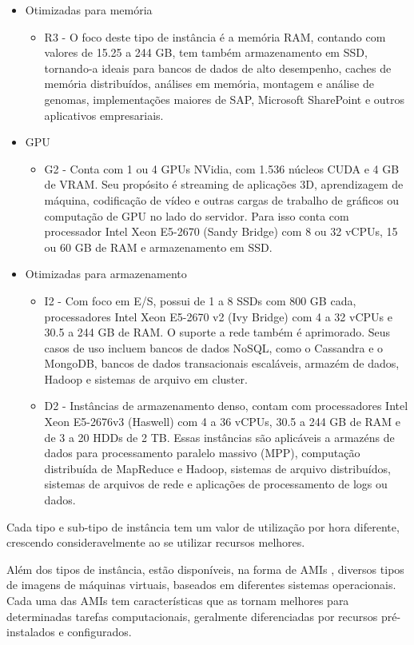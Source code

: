 \documentclass[tg]{mdtufsm}
\begin{document}
\begin{itemize}
\begin{itemize}
	\end{itemize}
\item Otimizadas para memória
	\begin{itemize}
	\item R3 - O foco deste tipo de instância é a memória RAM, contando com valores de 15.25 a 244 GB, tem também armazenamento em SSD, tornando-a ideais para bancos de dados de alto desempenho, caches de memória distribuídos, análises em memória, montagem e análise de genomas, implementações maiores de SAP, Microsoft SharePoint e outros aplicativos empresariais.
	\end{itemize}
\item GPU
	\begin{itemize}
	\item G2 - Conta com 1 ou 4 GPUs NVidia, com 1.536 núcleos CUDA e 4 GB de VRAM. Seu propósito é streaming de aplicações 3D, aprendizagem de máquina, codificação de vídeo e outras cargas de trabalho de gráficos ou computação de GPU no lado do servidor. Para isso conta com processador Intel Xeon E5-2670 (Sandy Bridge) com 8 ou 32 vCPUs, 15 ou 60 GB de RAM e armazenamento em SSD.
	\end{itemize}
\item Otimizadas para armazenamento
	\begin{itemize}
	\item I2 - Com foco em E/S, possui de 1 a 8 SSDs com 800 GB cada, processadores Intel Xeon E5-2670 v2 (Ivy Bridge) com 4 a 32 vCPUs e 30.5 a 244 GB de RAM. O suporte a rede também é aprimorado. Seus casos de uso incluem bancos de dados NoSQL, como o Cassandra e o MongoDB, bancos de dados transacionais escaláveis, armazém de dados, Hadoop e sistemas de arquivo em cluster.
	\item D2 - Instâncias de armazenamento denso, contam com processadores Intel Xeon E5-2676v3 (Haswell) com 4 a 36 vCPUs, 30.5 a 244 GB de RAM e de 3 a 20 HDDs de 2 TB. Essas instâncias são aplicáveis a armazéns de dados para processamento paralelo massivo (MPP), computação distribuída de MapReduce e Hadoop, sistemas de arquivo distribuídos, sistemas de arquivos de rede e aplicações de processamento de logs ou dados.
	\end{itemize}
\end{itemize}

Cada tipo e sub-tipo de instância tem um valor de utilização por hora diferente, crescendo consideravelmente ao se utilizar recursos melhores.

Além dos tipos de instância, estão disponíveis, na forma de AMIs \cite{ami}, diversos tipos de imagens de máquinas virtuais, baseados em diferentes sistemas operacionais. Cada uma das AMIs tem características que as tornam melhores para determinadas tarefas computacionais, geralmente diferenciadas por recursos pré-instalados e configurados.
\end{document}
